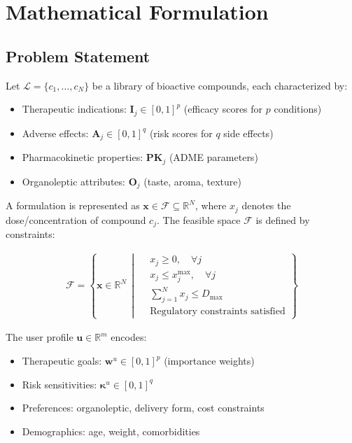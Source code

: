 \documentclass[12pt, a4paper]{article}
\begin{document}
\section{Mathematical Formulation}

\subsection{Problem Statement}

Let $\mathcal{L} = \{c_1, \ldots, c_N\}$ be a library of bioactive compounds, each characterized by:
\begin{itemize}
    \item Therapeutic indications: $\mathbf{I}_j \in [0,1]^p$ (efficacy scores for $p$ conditions)
    \item Adverse effects: $\mathbf{A}_j \in [0,1]^q$ (risk scores for $q$ side effects)
    \item Pharmacokinetic properties: $\mathbf{PK}_j$ (ADME parameters)
    \item Organoleptic attributes: $\mathbf{O}_j$ (taste, aroma, texture)
\end{itemize}

A formulation is represented as $\mathbf{x} \in \mathcal{F} \subseteq \mathbb{R}^N$, where $x_j$ denotes the dose/concentration of compound $c_j$. The feasible space $\mathcal{F}$ is defined by constraints:

\begin{align}
\mathcal{F} = \left\{ \mathbf{x} \in \mathbb{R}^N \,\middle|\, 
\begin{aligned}
    &x_j \geq 0, \quad \forall j \\
    &x_j \leq x_j^{\max}, \quad \forall j \\
    &\sum_{j=1}^N x_j \leq D_{\max} \\
    &\text{Regulatory constraints satisfied}
\end{aligned}
\right\}
\end{align}

The user profile $\mathbf{u} \in \mathbb{R}^m$ encodes:
\begin{itemize}
    \item Therapeutic goals: $\mathbf{w}^u \in [0,1]^p$ (importance weights)
    \item Risk sensitivities: $\boldsymbol{\kappa}^u \in [0,1]^q$
    \item Preferences: organoleptic, delivery form, cost constraints
    \item Demographics: age, weight, comorbidities
\end{itemize}
\end{document}

